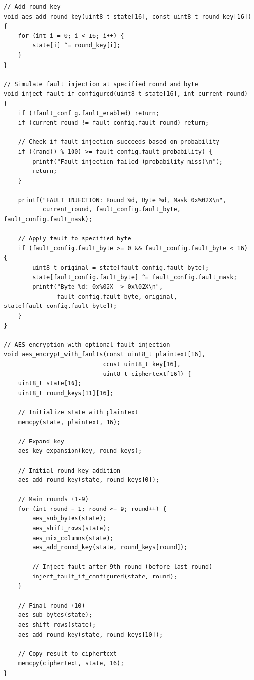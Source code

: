 \documentclass[12pt,a4paper]{article}
\begin{document}
\begin{lstlisting}[caption={AES Implementation with Controlled Fault Injection}]
// Add round key
void aes_add_round_key(uint8_t state[16], const uint8_t round_key[16]) {
    for (int i = 0; i < 16; i++) {
        state[i] ^= round_key[i];
    }
}

// Simulate fault injection at specified round and byte
void inject_fault_if_configured(uint8_t state[16], int current_round) {
    if (!fault_config.fault_enabled) return;
    if (current_round != fault_config.fault_round) return;
    
    // Check if fault injection succeeds based on probability
    if ((rand() % 100) >= fault_config.fault_probability) {
        printf("Fault injection failed (probability miss)\n");
        return;
    }
    
    printf("FAULT INJECTION: Round %d, Byte %d, Mask 0x%02X\n", 
           current_round, fault_config.fault_byte, fault_config.fault_mask);
    
    // Apply fault to specified byte
    if (fault_config.fault_byte >= 0 && fault_config.fault_byte < 16) {
        uint8_t original = state[fault_config.fault_byte];
        state[fault_config.fault_byte] ^= fault_config.fault_mask;
        printf("Byte %d: 0x%02X -> 0x%02X\n", 
               fault_config.fault_byte, original, state[fault_config.fault_byte]);
    }
}

// AES encryption with optional fault injection
void aes_encrypt_with_faults(const uint8_t plaintext[16], 
                            const uint8_t key[16], 
                            uint8_t ciphertext[16]) {
    uint8_t state[16];
    uint8_t round_keys[11][16];
    
    // Initialize state with plaintext
    memcpy(state, plaintext, 16);
    
    // Expand key
    aes_key_expansion(key, round_keys);
    
    // Initial round key addition
    aes_add_round_key(state, round_keys[0]);
    
    // Main rounds (1-9)
    for (int round = 1; round <= 9; round++) {
        aes_sub_bytes(state);
        aes_shift_rows(state);
        aes_mix_columns(state);
        aes_add_round_key(state, round_keys[round]);
        
        // Inject fault after 9th round (before last round)
        inject_fault_if_configured(state, round);
    }
    
    // Final round (10)
    aes_sub_bytes(state);
    aes_shift_rows(state);
    aes_add_round_key(state, round_keys[10]);
    
    // Copy result to ciphertext
    memcpy(ciphertext, state, 16);
}


\end{lstlisting}
\end{document}
